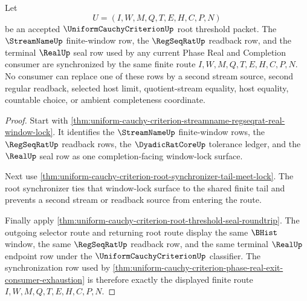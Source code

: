 \begin{theorem}
\label{thm:uniform-cauchy-criterion-regseqrat-streamname-seal-synchronization}
Let
$$
U=(I,W,M,Q,T,E,H,C,P,N)
$$
be an accepted $\UniformCauchyCriterionUp$ root threshold packet. The $\StreamNameUp$ finite-window row, the $\RegSeqRatUp$ readback row, and the terminal $\RealUp$ seal row used by any current Phase Real and Completion consumer are synchronized by the same finite route $I,W,M,Q,T,E,H,C,P,N$. No consumer can replace one of these rows by a second stream source, second regular readback, selected host limit, quotient-stream equality, host equality, countable choice, or ambient completeness coordinate.
\end{theorem}
\begin{proof}
Start with \autoref{thm:uniform-cauchy-criterion-streamname-regseqrat-real-window-lock}. It identifies the $\StreamNameUp$ finite-window rows, the $\RegSeqRatUp$ readback rows, the $\DyadicRatCoreUp$ tolerance ledger, and the $\RealUp$ seal row as one completion-facing window-lock surface.

Next use \autoref{thm:uniform-cauchy-criterion-root-synchronizer-tail-meet-lock}. The root synchronizer ties that window-lock surface to the shared finite tail and prevents a second stream or readback source from entering the route.

Finally apply \autoref{thm:uniform-cauchy-criterion-root-threshold-seal-roundtrip}. The outgoing selector route and returning root route display the same $\BHist$ window, the same $\RegSeqRatUp$ readback row, and the same terminal $\RealUp$ endpoint row under the $\UniformCauchyCriterionUp$ classifier. The synchronization row used by \autoref{thm:uniform-cauchy-criterion-phase-real-exit-consumer-exhaustion} is therefore exactly the displayed finite route $I,W,M,Q,T,E,H,C,P,N$.
\end{proof}

